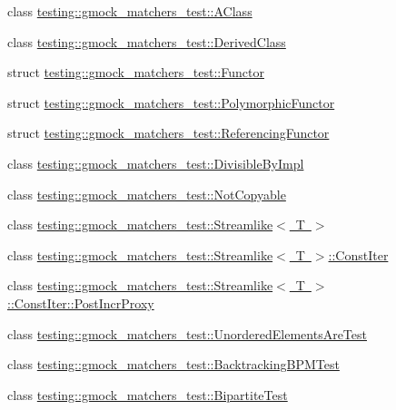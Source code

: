 \begin{DoxyCompactItemize}
\item 
class \mbox{\hyperlink{classtesting_1_1gmock__matchers__test_1_1_a_class}{testing\+::gmock\+\_\+matchers\+\_\+test\+::\+A\+Class}}
\item 
class \mbox{\hyperlink{classtesting_1_1gmock__matchers__test_1_1_derived_class}{testing\+::gmock\+\_\+matchers\+\_\+test\+::\+Derived\+Class}}
\item 
struct \mbox{\hyperlink{structtesting_1_1gmock__matchers__test_1_1_functor}{testing\+::gmock\+\_\+matchers\+\_\+test\+::\+Functor}}
\item 
struct \mbox{\hyperlink{structtesting_1_1gmock__matchers__test_1_1_polymorphic_functor}{testing\+::gmock\+\_\+matchers\+\_\+test\+::\+Polymorphic\+Functor}}
\item 
struct \mbox{\hyperlink{structtesting_1_1gmock__matchers__test_1_1_referencing_functor}{testing\+::gmock\+\_\+matchers\+\_\+test\+::\+Referencing\+Functor}}
\item 
class \mbox{\hyperlink{classtesting_1_1gmock__matchers__test_1_1_divisible_by_impl}{testing\+::gmock\+\_\+matchers\+\_\+test\+::\+Divisible\+By\+Impl}}
\item 
class \mbox{\hyperlink{classtesting_1_1gmock__matchers__test_1_1_not_copyable}{testing\+::gmock\+\_\+matchers\+\_\+test\+::\+Not\+Copyable}}
\item 
class \mbox{\hyperlink{classtesting_1_1gmock__matchers__test_1_1_streamlike}{testing\+::gmock\+\_\+matchers\+\_\+test\+::\+Streamlike$<$ T $>$}}
\item 
class \mbox{\hyperlink{classtesting_1_1gmock__matchers__test_1_1_streamlike_1_1_const_iter}{testing\+::gmock\+\_\+matchers\+\_\+test\+::\+Streamlike$<$ T $>$\+::\+Const\+Iter}}
\item 
class \mbox{\hyperlink{classtesting_1_1gmock__matchers__test_1_1_streamlike_1_1_const_iter_1_1_post_incr_proxy}{testing\+::gmock\+\_\+matchers\+\_\+test\+::\+Streamlike$<$ T $>$\+::\+Const\+Iter\+::\+Post\+Incr\+Proxy}}
\item 
class \mbox{\hyperlink{classtesting_1_1gmock__matchers__test_1_1_unordered_elements_are_test}{testing\+::gmock\+\_\+matchers\+\_\+test\+::\+Unordered\+Elements\+Are\+Test}}
\item 
class \mbox{\hyperlink{classtesting_1_1gmock__matchers__test_1_1_backtracking_b_p_m_test}{testing\+::gmock\+\_\+matchers\+\_\+test\+::\+Backtracking\+B\+P\+M\+Test}}
\item 
class \mbox{\hyperlink{classtesting_1_1gmock__matchers__test_1_1_bipartite_test}{testing\+::gmock\+\_\+matchers\+\_\+test\+::\+Bipartite\+Test}}

\end{DoxyCompactItemize}
